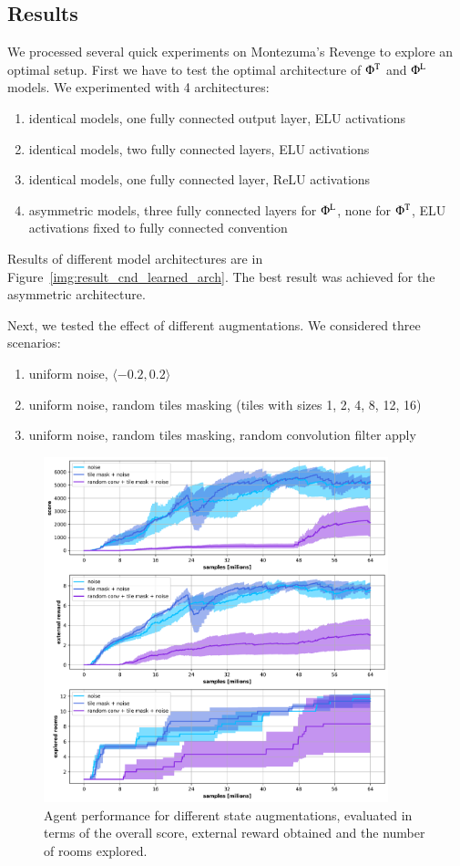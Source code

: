 \documentclass[a4paper,11pt]{elsarticle}
\begin{document}
\subsection{Results}

We processed several quick experiments on Montezuma's Revenge to explore an optimal setup.
First we have to test the optimal architecture of $\Phi^{\rm T}$ and $\Phi^{\rm L}$ models. 
We experimented with 4 architectures: 
\begin{enumerate}
    \item identical models, one fully connected output layer, ELU activations
    \item identical models, two fully connected layers, ELU activations
    \item identical models, one fully connected layer, ReLU activations
    \item asymmetric models, three fully connected layers for $\Phi^{\rm L}$, none for $\Phi^{\rm T}$, ELU activations fixed to fully connected convention
\end{enumerate}
Results of different model architectures are in Figure~\ref{img:result_cnd_learned_arch}. The best result was achieved for the asymmetric architecture.

Next, we tested the effect of different augmentations. We considered three scenarios: 
\begin{enumerate}
    \item uniform noise, $\langle -0.2, 0.2 \rangle$
    \item uniform noise, random tiles masking (tiles with sizes 1, 2, 4, 8, 12, 16)
    \item uniform noise,  random tiles masking, random convolution filter apply
\end{enumerate}

\begin{figure}[t!]
\centering
\includegraphics[width=10cm]{fig/results/aux_experiments/cnd_vicreg_augmentations.png}
\caption{Agent performance for different state augmentations, evaluated in terms of the overall score, external reward obtained and the number of rooms explored.}
\label{img:result_cnd_aug}
\end{figure}
\end{document}
